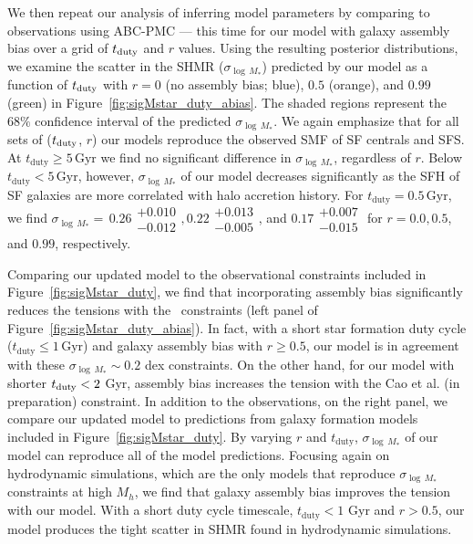 \documentclass[12pt, letterpaper, preprint, tighten]{aastex62}
\begin{document}
We then repeat our analysis of inferring model parameters by comparing to  
observations using ABC-PMC --- this time for our model with galaxy assembly 
bias over a grid of $t_{\rm duty}$ and $r$ values. Using the resulting 
posterior distributions, we examine the scatter in the SHMR ($\sigma_{\log\,M_*}$) 
predicted by our model as a function of $t_{\rm duty}$ with $r=0$ (no 
assembly bias; blue), $0.5$ (orange), and $0.99$ (green) in Figure~\ref{fig:sigMstar_duty_abias}. 
The shaded regions represent the $68\%$ confidence interval of the predicted 
$\sigma_{\log\,M_*}$. We again emphasize that for all sets of ($t_{\rm duty}$, $r$) 
our models reproduce the observed SMF of SF centrals and SFS.  
At $t_\mathrm{duty} \geq 5\,\mathrm{Gyr}$ we find no significant difference 
in $\sigma_{\log\,M_*}$, regardless of $r$. Below $t_\mathrm{duty} < 5\,\mathrm{Gyr}$, 
however, $\sigma_{\log\,M_*}$ of our model decreases significantly as the SFH 
of SF galaxies are more correlated with halo accretion history.
For $t_\mathrm{duty} = 0.5\,\mathrm{Gyr}$, we find $\sigma_{\log\,M_*}{=}\,0.26\substack{+0.010\\-0.012}, 
0.22\substack{+0.013\\-0.005}$, and $0.17\substack{+0.007\\-0.015} $ 
for $r = 0.0, 0.5$, and $0.99$, respectively. 

Comparing our updated model to the observational constraints included in 
Figure~\ref{fig:sigMstar_duty}, we find that incorporating assembly bias 
significantly reduces the tensions with the~\cite{more2011, leauthaud2012, reddick2013, tinker2013, zu2015} 
constraints (left panel of Figure~\ref{fig:sigMstar_duty_abias}). In fact, 
with a short star formation duty cycle ($t_\mathrm{duty} \leq 1\,\mathrm{Gyr}$) 
and galaxy assembly bias with $r \ge 0.5$, our model is in agreement with 
these $\sigma_{\log\,M_*} \sim 0.2$ dex constraints. On the other hand, 
for our model with shorter $t_{\rm duty} < 2$ Gyr, assembly bias increases 
the tension with the Cao et al. (in preparation) constraint. 
In addition to the observations, on the right panel, we compare our updated 
model to predictions from galaxy formation models included in Figure~\ref{fig:sigMstar_duty}.
By varying $r$ and $t_\mathrm{duty}$, $\sigma_{\log\,M_*}$ of our model 
can reproduce all of the model predictions. Focusing again on hydrodynamic
simulations, which are the only models that reproduce $\sigma_{\log\,M_*}$ 
constraints at high $M_h$, we find that galaxy assembly bias 
improves the tension with our model. With a short duty cycle timescale, 
$t_\mathrm{duty} < 1$ Gyr and $r > 0.5$, our model produces the tight
scatter in SHMR found in hydrodynamic simulations. 
\end{document}
